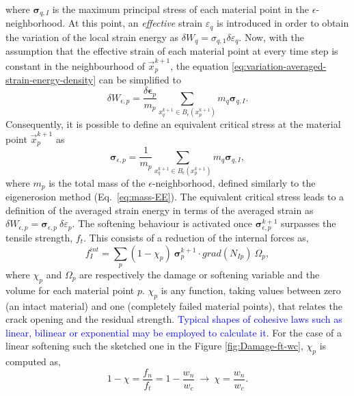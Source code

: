 \documentclass[preprint,12pt,a4paper]{elsarticle}
\newcommand{\tens}[1]{
  \ensuremath{\mathbf{{#1}}}
}
\newcommand\Grad[1]{grad({#1})}
\begin{document}
where $\tens{\sigma}_{q,I}$ is the maximum principal stress of each
material point in the $\epsilon$-neighborhood. At this point, an \textit{effective} strain $\varepsilon_q$ is introduced in order to obtain the variation of
the local strain energy as $\delta W_q = \sigma_{q,1}
\delta\varepsilon_q$. Now, with the assumption that the effective
strain of each material point at every time step is constant in the
neighbourhood of $\vec{x}_p^{k+1}$, the equation 
\eqref{eq:variation-averaged-strain-energy-density} can be simplified
 to
\begin{equation}
  \label{eq:variation-averaged-strain-energy-density-simpli}
  \delta W_{\epsilon,p} =
  \frac{\delta \tens{\epsilon}_p}{m_p} \sum_{x_q^{k+1} \in
  B_{\epsilon}(x_p^{k+1})} m_q \tens{\sigma}_{q,I}. 
\end{equation}
Consequently, it is possible to define an equivalent critical stress at the
material point $\vec{x}_p^{k+1}$ as
\begin{equation}
  \label{eq:equivalent-critical-stress}
  \tens{\sigma}_{\epsilon,p} =
  \frac{1}{m_p} \sum_{x_q^{k+1} \in
  B_{\epsilon}(x_p^{k+1})} m_q \tens{\sigma}_{q,I}, 
\end{equation}
where $m_p$ is the total mass of the
$\epsilon$-neighborhood, defined similarly to the eigenerosion
  method (Eq.~\eqref{eq:mass-EE}). The equivalent critical stress
  leads to a definition of the   averaged strain energy in terms of the averaged
strain as $\delta W_{\epsilon,p} =
 \tens{\sigma}_{\epsilon,p}\ \delta\varepsilon_p$. The softening behaviour is
activated once $\tens{\sigma}_{\epsilon,p}^{k+1}$ surpasses the
tensile strength, $f_t$. This consists of a reduction of the internal
forces as, 
 \begin{equation}
   \label{eq:f-int-damaged}
   f^{int}_I = \sum_p (1 - \chi_p)\ \tens{\sigma}_{p}^{k+1} \cdot
   \Grad{N_{Ip}}\ \Omega_p,
 \end{equation}
where $\chi_p$ and $\Omega_p$ are respectively the damage or softening
variable and the volume for each material point $p$. $\chi_p$ is any function, taking
values between zero (an intact material) and one (completely failed
material points), that relates the crack opening and the residual strength. \textcolor{blue}{Typical shapes of cohesive laws such as linear, bilinear or exponential may be employed to calculate it}. For the case of a linear softening such the sketched one in the Figure \ref{fig:Damage-ft-wc}, $\chi_p$ is computed as,
 \begin{equation}
   \label{eq:damaged-variable-chi}
   1 - \chi = \frac{f_n}{f_t} = 1 - \frac{w_n}{w_c}\ \rightarrow\ \chi
   = \frac{w_n}{w_c}.
 \end{equation}
\end{document}

